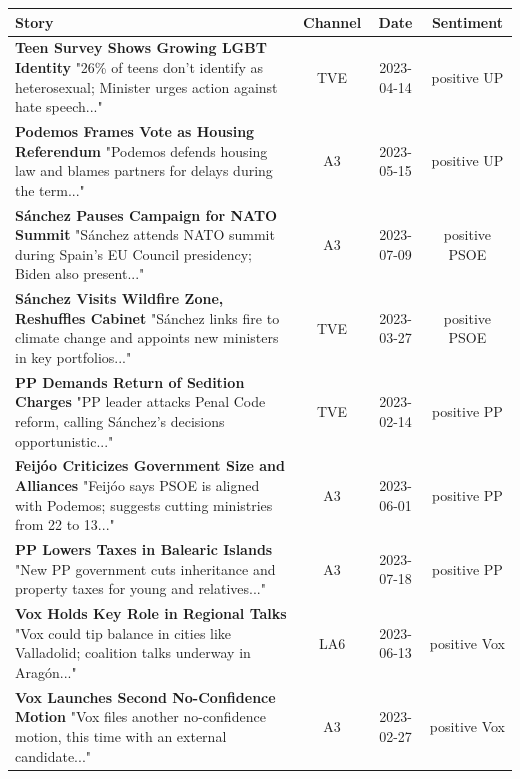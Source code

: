 \documentclass[12pt]{article}
\begin{document}
	\begin{longtable}{|p{8cm}|c|c|c|}
		\hline
		\textbf{Story} & \textbf{Channel} & \textbf{Date} & \textbf{Sentiment} \\
		\hline
		\textbf{Teen Survey Shows Growing LGBT Identity} \newline
		"26\% of teens don't identify as heterosexual; Minister urges action against hate speech..." & TVE & 2023-04-14 & positive UP \\
		\hline
		\textbf{Podemos Frames Vote as Housing Referendum} \newline
		"Podemos defends housing law and blames partners for delays during the term..." & A3 & 2023-05-15 & positive UP \\
		\hline
		\textbf{Sánchez Pauses Campaign for NATO Summit} \newline
		"Sánchez attends NATO summit during Spain's EU Council presidency; Biden also present..." & A3 & 2023-07-09 & positive PSOE \\
		\hline
		\textbf{Sánchez Visits Wildfire Zone, Reshuffles Cabinet} \newline
		"Sánchez links fire to climate change and appoints new ministers in key portfolios..." & TVE & 2023-03-27 & positive PSOE \\
		\hline
		\textbf{PP Demands Return of Sedition Charges} \newline
		"PP leader attacks Penal Code reform, calling Sánchez's decisions opportunistic..." & TVE & 2023-02-14 & positive PP \\
		\hline
		\textbf{Feijóo Criticizes Government Size and Alliances} \newline
		"Feijóo says PSOE is aligned with Podemos; suggests cutting ministries from 22 to 13..." & A3 & 2023-06-01 & positive PP \\
		\hline
		\textbf{PP Lowers Taxes in Balearic Islands} \newline
		"New PP government cuts inheritance and property taxes for young and relatives..." & A3 & 2023-07-18 & positive PP \\
		\hline
		\textbf{Vox Holds Key Role in Regional Talks} \newline
		"Vox could tip balance in cities like Valladolid; coalition talks underway in Aragón..." & LA6 & 2023-06-13 & positive Vox \\
		\hline
		\textbf{Vox Launches Second No-Confidence Motion} \newline
		"Vox files another no-confidence motion, this time with an external candidate..." & A3 & 2023-02-27 & positive Vox \\

\end{longtable}
\end{document}
